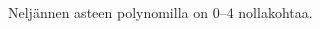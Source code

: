 \begin{esimerkki} Neljännen asteen polynomilla on $0$--$4$ nollakohtaa.

\begin{lukusuora}{-4}{4}{3.6}
\end{lukusuora}
\begin{lukusuora}{-4}{4}{3.6}
\end{lukusuora}
\begin{lukusuora}{-4}{4}{3.6}
\end{lukusuora}

\begin{lukusuora}{-4}{4}{3.6}
\end{lukusuora}
\begin{lukusuora}{-2.8}{2.8}{3.6}
\end{lukusuora}
\end{esimerkki}